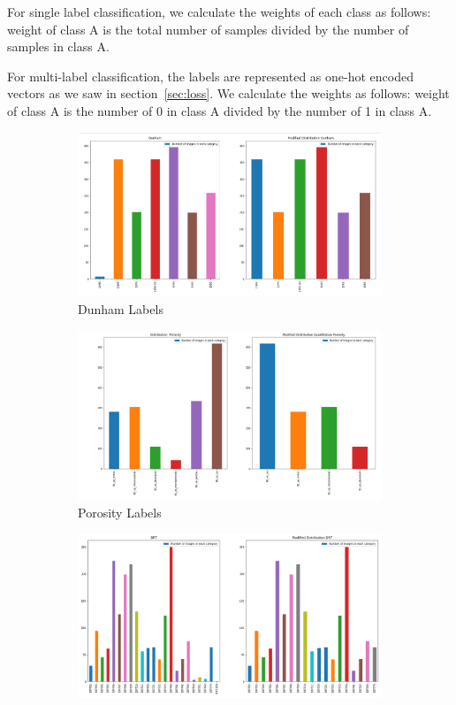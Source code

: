 For single label classification, we calculate the weights of each class as follows: weight of class A is the total number of samples divided by the number of samples in class A.

For multi-label classification, the labels are represented as one-hot encoded vectors as we saw in section~\ref{sec:loss}. We calculate the weights as follows: weight of class A is the number of 0 in class A divided by the number of 1 in class A.

\begin{figure}
\begin{subfigure}{.5\textwidth}
  \centering
  \includegraphics[width=.8\linewidth]{figures/03-Dunham.PNG}
  \caption{Dunham Labels}
  \label{fig:dunhamlab}
\end{subfigure}%
\begin{subfigure}{.5\textwidth}
  \centering
  \includegraphics[width=.8\linewidth]{figures/03-porosity_baby.PNG}
  \caption{Porosity Labels}
  \label{fig:porolab}
\end{subfigure}
\begin{subfigure}{.5\textwidth}
  \centering
  \includegraphics[width=.8\linewidth]{figures/03-DRT.PNG}

\end{subfigure}
\end{figure}
